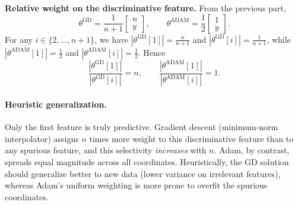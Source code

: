 \documentclass[a4paper]{article}
\begin{document}
\begin{itemize}
\textbf{Relative weight on the discriminative feature.}
From the previous part,
\[
\theta^{\text{GD}}=\frac{1}{n+1}\begin{bmatrix} n \\ y \end{bmatrix},
\qquad
\theta^{\text{ADAM}}=\frac{1}{2}\begin{bmatrix} 1 \\ y \end{bmatrix}.
\]
For any $i\in\{2,\dots,n+1\}$, we have $|\theta^{\text{GD}}[1]|=\tfrac{n}{n+1}$ and $|\theta^{\text{GD}}[i]|=\tfrac{1}{n+1}$, while
$|\theta^{\text{ADAM}}[1]|=\tfrac{1}{2}$ and $|\theta^{\text{ADAM}}[i]|=\tfrac{1}{2}$. Hence
\[
\frac{|\theta^{\text{GD}}[1]|}{|\theta^{\text{GD}}[i]|}=n,
\qquad
\frac{|\theta^{\text{ADAM}}[1]|}{|\theta^{\text{ADAM}}[i]|}=1.
\]

\paragraph{Heuristic generalization.}
Only the first feature is truly predictive. Gradient descent (minimum-norm interpolator) assigns $n$ times more weight to this discriminative feature than to any spurious feature, and this selectivity \emph{increases} with $n$. Adam, by contrast, spreads equal magnitude across all coordinates. Heuristically, the GD solution should generalize better to new data (lower variance on irrelevant features), whereas Adam’s uniform weighting is more prone to overfit the spurious coordinates.

\end{itemize}
\end{document}
